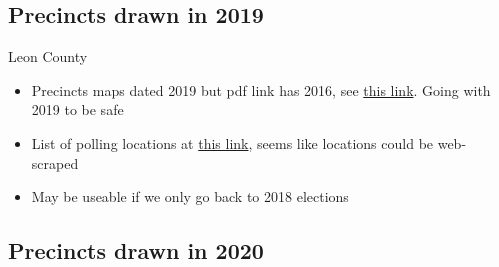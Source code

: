 \documentclass[12pt]{article}
\begin{document}
\clearpage

\subsection{Precincts drawn in 2019}
Leon County
\begin{itemize}
  \item Precincts maps dated 2019 but pdf link has 2016, see \href{https://www.leonvotes.org/Portals/Leon/Documents/Maps_and%20Demographics/Pdfs/2016/Pct_Mapbook_2016.pdf}{this link}. Going with 2019 to be safe
  \item List of polling locations at \href{https://www.voterfocus.com/PrecinctFinder/precinctDirectory?county=FL-LEO}{this link},  seems like locations could be web-scraped
  \item May be useable if we only go back to 2018 elections
\end{itemize}

\clearpage

\subsection{Precincts drawn in 2020}
\end{document}
